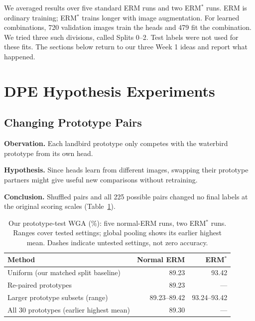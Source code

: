 \documentclass[runningheads]{llncs}
\makeatletter
\newenvironment{methodfigure}{\par\medskip\noindent
  \begin{minipage}{\linewidth}\centering\def\@captype{figure}}
  {\end{minipage}\par\medskip}
\makeatother
\begin{document}
We averaged results over five standard ERM runs and two ERM$^*$ runs. ERM is ordinary training; ERM$^*$ trains longer with image augmentation. For learned combinations, 720 validation images train the heads and 479 fit the combination. We tried three such divisions, called Splits 0--2. Test labels were not used for these fits. The sections below return to our three Week 1 ideas and report what happened.

\newpage
\section{DPE Hypothesis Experiments}
\subsection{Changing Prototype Pairs}
\textbf{Obervation.} Each landbird prototype only competes with the waterbird prototype from its own head.

\textbf{Hypothesis.} Since heads learn from different images, swapping their prototype partners might give useful new comparisons without retraining.

\begin{methodfigure}

\caption{Change partners, then average. $L$: landbird; $W$: waterbird. Numbers identify the original head. The points stay fixed.}
\label{fig:h1}
\end{methodfigure}

\textbf{Conclusion.} Shuffled pairs and all 225 possible pairs changed no final labels at the original scoring scales (Table~\ref{tab:pair-results}).

\begin{table}[!ht]
\centering
\caption{Our prototype-test WGA (\%): five normal-ERM runs, two ERM$^*$ runs. Ranges cover tested settings; global pooling shows its earlier highest mean. Dashes indicate untested settings, not zero accuracy.}
\label{tab:pair-results}
\small
\setlength{\tabcolsep}{5pt}
\begin{tabular}{@{}lrr@{}}
\toprule
Method & Normal ERM & ERM$^*$\\
\midrule
Uniform (our matched split baseline) & 89.23 & 93.42\\
Re-paired prototypes & 89.23 & ---\\
Larger prototype subsets (range) & 89.23--89.42 & 93.24--93.42\\
All 30 prototypes (earlier highest mean) & 89.30 & ---\\
\bottomrule
\end{tabular}
\end{table}
\end{document}

